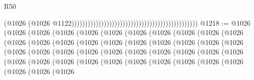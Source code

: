 \begin{lexlean}{R50}
\begin{coremodule}
                                                                                              (@1026
                                                                                                (@1026
                                                                                                  @1122)))))))))))))))))))))))))))))))))))))))))))))))
@1218 := @1026
    (@1026
      (@1026
        (@1026
          (@1026
            (@1026
              (@1026
                (@1026
                  (@1026
                    (@1026
                      (@1026
                        (@1026
                          (@1026
                            (@1026
                              (@1026
                                (@1026
                                  (@1026
                                    (@1026
                                      (@1026
                                        (@1026
                                          (@1026
                                            (@1026
                                              (@1026
                                                (@1026
                                                  (@1026
                                                    (@1026
                                                      (@1026
                                                        (@1026
                                                          (@1026
                                                            (@1026
                                                              (@1026
                                                                (@1026
                                                                  (@1026
                                                                    (@1026
                                                                      (@1026
                                                                        (@1026
                                                                          (@1026
                                                                            (@1026
                                                                              (@1026
                                                                                (@1026
                                                                                  (@1026
                                                                                    (@1026
                                                                                      (@1026
                                                                                        (@1026

\end{coremodule}
\end{lexlean}
